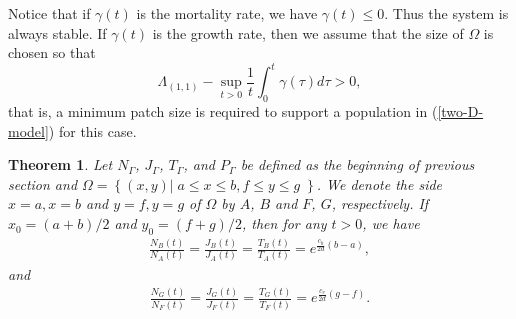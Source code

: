\documentclass[11pt]{article}
\newtheorem{theorem}{Theorem}[section]
\newcommand{\bea}{\begin{eqnarray}}
\newcommand{\eea}{\end{eqnarray}}
\begin{document}
Notice that if $\gamma(t)$ is the mortality rate, we have $\gamma(t)\leq 0$. Thus the system is always stable. If $\gamma(t)$ is the growth rate, then we assume that the size of $\Omega$ is chosen so that
\[  \Lambda_{(1, 1)}-\sup_{t>0}\frac{1}{t}\int_0^t\gamma(\tau)d\tau >0,\]
that is, a minimum patch size is required to support a population in (\ref{two-D-model}) for this case. 

\begin{theorem}\label{thm1} Let $N_{\Gamma}$, $J_\Gamma$, $T_\Gamma$, and $P_\Gamma$ be defined as the beginning of previous section and $\Omega=\left\{(x, y)|\; a\leq x\leq b, f\leq y\leq g\;\right\}$. We denote the side $x=a, x=b$ and $y=f, y=g$ of $\Omega$ by $A$, $B$ and $F$, $G$, respectively. If $x_0=(a+b)/2$ and $y_0=(f+g)/2$, then for any  $t>0$, we have
{\small
\bea\label{ch1}
\frac{N_B(t)}{N_A(t)}=\frac{J_B(t)}{J_A(t)}=\frac{T_B(t)}{T_A(t)}=e^{\frac{c_h}{2d}(b-a)},
\eea}
and
{\small
\bea\label{ch2}
\frac{N_G(t)}{N_F(t)}=\frac{J_G(t)}{J_F(t)}=\frac{T_G(t)}{T_F(t)}=e^{\frac{c_v}{2d}(g-f)}.
\eea}
\end{theorem}
\end{document}
